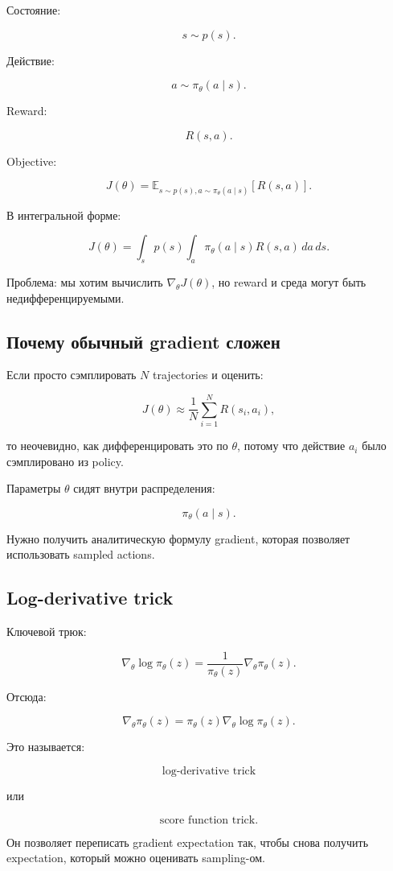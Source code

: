 \documentclass[a4paper,12pt]{article}
\begin{document}
Состояние:

\[
s \sim p(s).
\]

Действие:

\[
a \sim \pi_\theta(a \mid s).
\]

Reward:

\[
R(s,a).
\]

Objective:

\[
J(\theta)
=
\mathbb{E}_{s\sim p(s), a\sim \pi_\theta(a\mid s)}
[
R(s,a)
].
\]

В интегральной форме:

\[
J(\theta)
=
\int_s
p(s)
\int_a
\pi_\theta(a\mid s)
R(s,a)
\,da\,ds.
\]

Проблема: мы хотим вычислить \(\nabla_\theta J(\theta)\), но reward и среда могут быть недифференцируемыми.

\subsection{Почему обычный gradient сложен}

Если просто сэмплировать \(N\) trajectories и оценить:

\[
J(\theta)
\approx
\frac{1}{N}
\sum_{i=1}^{N}
R(s_i,a_i),
\]

то неочевидно, как дифференцировать это по \(\theta\), потому что действие \(a_i\) было сэмплировано из policy.

Параметры \(\theta\) сидят внутри распределения:

\[
\pi_\theta(a\mid s).
\]

Нужно получить аналитическую формулу gradient, которая позволяет использовать sampled actions.

\subsection{Log-derivative trick}

Ключевой трюк:

\[
\nabla_\theta \log \pi_\theta(z)
=
\frac{1}{\pi_\theta(z)}
\nabla_\theta \pi_\theta(z).
\]

Отсюда:

\[
\nabla_\theta \pi_\theta(z)
=
\pi_\theta(z)
\nabla_\theta \log \pi_\theta(z).
\]

Это называется:

\[
\text{log-derivative trick}
\]

или

\[
\text{score function trick}.
\]

Он позволяет переписать gradient expectation так, чтобы снова получить expectation, который можно оценивать sampling-ом.
\end{document}
